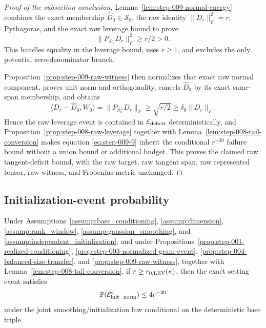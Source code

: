 \begin{proof}[Proof of the subsection conclusion]

Lemma~\ref{lem:step-009-normal-energy} combines the exact membership
\(\widehat D_0\in\mathscr S_0\), the raw identity
\(\|D_r\|_F^2=r\), Pythagoras, and the exact raw leverage bound to prove
\[
  \|P_{\mathscr S_0^\perp}D_r\|_F^2\ge r/2>0.
\]
This handles equality in the leverage bound, uses \(r\ge1\), and excludes the only
potential zero-denominator branch.

Proposition~\ref{prop:step-009-raw-witness} then normalizes that exact raw
normal component, proves unit norm and orthogonality, cancels
\(\widehat D_0\) by its exact same-span membership, and obtains
\[
  \langle D_r-\widehat D_0,W_0\rangle
  =\|P_{\mathscr S_0^\perp}D_r\|_F
  \ge\sqrt{r/2}
  \ge\delta_0\|D_r\|_F.
\]
Hence the raw leverage event is contained in
\(\mathcal E_{\rm deficit}\) deterministically,
and Proposition~\ref{prop:step-008-raw-leverage} together with
Lemma~\ref{lem:step-008-tail-conversion} makes equation
\eqref{eq:step-009-9} inherit the conditional \(r^{-20}\) failure bound
without a union bound or additional budget. This proves the claimed raw
tangent-deficit bound, with the raw target, raw tangent span, raw represented tensor, raw
witness, and Frobenius metric unchanged.

\end{proof}

\subsection{Initialization-event probability}\label{app:step-010}

\begin{proposition}
\label{prop:step-010-conditional-union}
Under Assumptions~\ref{assump:base_conditioning},
\ref{assump:dimension}, \ref{assump:rank_window},
\ref{assump:gaussian_smoothing}, and
\ref{assump:independent_initialization}, and under
Propositions~\ref{prop:step-001-realized-conditioning},
\ref{prop:step-003-normalized-gram-event},
\ref{prop:step-004-balanced-size-transfer}, and
\ref{prop:step-009-raw-witness}, together with
Lemma~\ref{lem:step-008-tail-conversion}, if
\(r\ge r_{0,\rm LEV}(\kappa)\), then the exact setting event satisfies
\[
  \mathbb P(\mathcal E_{\rm init\_norm}^{\mathsf c})\le4r^{-20}
\]
under the joint smoothing/initialization law conditional on the deterministic
base triple.

\end{proposition}

